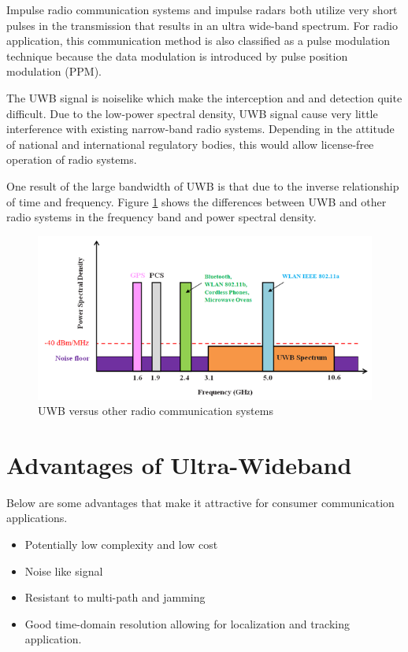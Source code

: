 \documentclass[\main/main.tex]{subfiles}
\begin{document}
Impulse radio communication systems and impulse radars both utilize very short pulses in the transmission that results in an ultra wide-band spectrum. For radio application, this communication method is also classified as a pulse modulation technique because the data modulation is introduced by pulse position modulation (PPM). 

The UWB signal is noiselike which make the interception and and detection quite difficult. Due to the low-power spectral density, UWB signal cause very little interference with existing narrow-band radio systems. Depending in the attitude of national and international regulatory bodies, this would allow license-free operation of radio systems.

One result of the large bandwidth of UWB is that due to the inverse relationship of
time and frequency. Figure \ref{fig:uwb_versus_other_radio_communication_systems} shows the differences between UWB and other radio systems in the frequency band and power spectral density.

\begin{figure}[H]
    \centering
    \includegraphics[width=1\textwidth]{uwb_versus_other_radio_communication_systems.png}
    \caption{UWB versus other radio communication systems}
    \label{fig:uwb_versus_other_radio_communication_systems}
\end{figure}

\section{Advantages of Ultra-Wideband}

Below \cite{uwb_theory_and_applications} are some advantages that make it attractive for consumer communication applications.
\begin{itemize}
    \item Potentially low complexity and low cost
    \item Noise like signal
    \item Resistant to multi-path and jamming
    \item Good time-domain resolution allowing for localization and tracking application.
\end{itemize}
\end{document}
